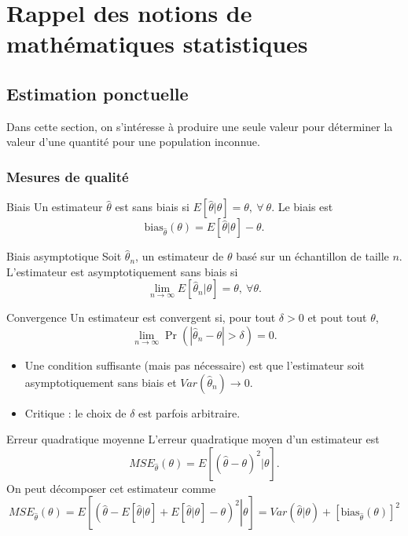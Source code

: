 \chapter{Rappel des notions de mathématiques statistiques}

\section{Estimation ponctuelle}

Dans cette section, on s'intéresse à produire une seule valeur pour déterminer la valeur d'une quantité pour une population inconnue. 

\subsection{Mesures de qualité}

\begin{definition}{Biais}{}
	Un estimateur $\hat{\theta}$ est sans biais si $E[\hat{\theta}\vert \theta] = \theta, ~\forall ~\theta$. Le biais est $$\text{bias}_{\hat{\theta}}(\theta) = E[\hat{\theta}\vert \theta] - \theta.$$
\end{definition}

\begin{definition}{Biais asymptotique}{}
	Soit $\hat{\theta}_n$, un estimateur de $\theta$ basé sur un échantillon de taille $n$. L'estimateur est asymptotiquement sans biais si $$\lim\limits_{n\to \infty }E[\hat{\theta}_n\vert \theta] = \theta, ~\forall \theta.$$
\end{definition}

\begin{definition}{Convergence}{}
	Un estimateur est convergent si, pour tout $\delta > 0$ et pout tout $\theta$, 
	$$\lim\limits_{n\to \infty} \Pr\left(|\hat{\theta}_n - \theta| > \delta\right) = 0.$$
	\tcblower
	\begin{itemize}
		\item Une condition suffisante (mais pas nécessaire) est que l'estimateur soit asymptotiquement sans biais et $Var\left(\hat{\theta}_n\right) \to 0$.
		\item Critique : le choix de $\delta$ est parfois arbitraire. 
	\end{itemize}
\end{definition}

\begin{definition}{Erreur quadratique moyenne}{}
	L'erreur quadratique moyen d'un estimateur est 
	$$MSE_{\hat{\theta}}(\theta) = E\left[\left(\hat{\theta} - \theta \right)^2 \vert \theta \right].$$
	\tcblower
	On peut décomposer cet estimateur comme
	$$MSE_{\hat{\theta}}(\theta) = E\left[ \left.\left(\hat{\theta} - E[\hat{\theta}\vert \theta] + E[\hat{\theta}\vert \theta] - \theta\right)^2 \right\vert \theta  \right] = Var\left(\hat{\theta}\vert \theta\right) + \left[\text{bias}_{\hat{\theta}}(\theta)\right]^2$$
\end{definition}

